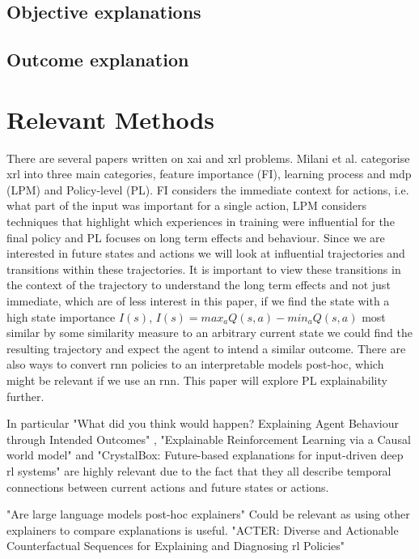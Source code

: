\documentclass[UKenglish]{uiomasterthesis}
\begin{document}
\subsection{Objective explanations}

\subsection{Outcome explanation}


\section{Relevant Methods}
There are several papers written on \ac{xai} and \ac{xrl} problems. Milani et al.\cite{milani2022survey} categorise \ac{xrl} into three main categories, feature importance (FI), learning process and \ac{mdp} (LPM) and Policy-level (PL). FI considers the immediate context for actions, i.e. what part of the input was important for a single action, LPM considers techniques that highlight which experiences in training were influential for the final policy and PL focuses on long term effects and behaviour. Since we are interested in future states and actions we will look at influential trajectories and transitions within these trajectories. It is important to view these transitions in the context of the trajectory to understand the long term effects and not just immediate, which are of less interest in this paper, if we find the state with a high state importance $I(s)$, $I(s) = max_aQ(s,a)-min_aQ(s,a)$ most similar by some similarity measure to an arbitrary current state we could find the resulting trajectory and expect the agent to intend a similar outcome. There are also ways to convert \ac{rnn} policies to an interpretable models post-hoc, which might be relevant if we use an \ac{rnn}. This paper will explore PL explainability further.

In particular "What did you think would happen? Explaining Agent Behaviour through Intended Outcomes" \cite{yau2020did}, "Explainable Reinforcement Learning via a Causal world model" \cite{yu2024explainable} and "CrystalBox: Future-based explanations for input-driven deep \ac{rl} systems" \cite{patel2024crystalbox} are highly relevant due to the fact that they all describe temporal connections between current actions and future states or actions.

"Are large language models post-hoc explainers" \cite{kroeger2024large} Could be relevant as using other explainers to compare explanations is useful. "ACTER: Diverse and Actionable Counterfactual Sequences for Explaining and Diagnosing \ac{rl} Policies" \cite{gajcin2024acter} 
\end{document}
